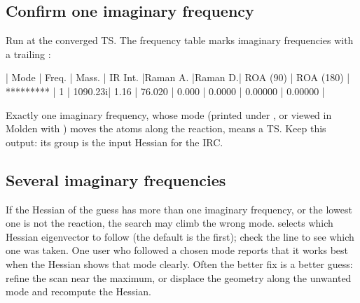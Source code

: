 \documentclass[letterpaper,10pt,english,openany,oneside]{sphinxmanual}
\begin{document}
\subsection{Confirm one imaginary frequency}
\label{\detokenize{tasks/ts-irc-scan:confirm-one-imaginary-frequency}}
\sphinxAtStartPar
Run  at the converged TS. The frequency table marks imaginary frequencies with a trailing :

\begin{sphinxVerbatim}[commandchars=\\\{\}]
 | Mode | Freq.   | Mass.  | IR Int. |Raman A. |Raman D.| ROA (90)  | ROA (180) |
 *\PYGZhy{}\PYGZhy{}\PYGZhy{}\PYGZhy{}\PYGZhy{}\PYGZhy{}*\PYGZhy{}\PYGZhy{}\PYGZhy{}\PYGZhy{}\PYGZhy{}\PYGZhy{}\PYGZhy{}\PYGZhy{}\PYGZhy{}*\PYGZhy{}\PYGZhy{}\PYGZhy{}\PYGZhy{}\PYGZhy{}\PYGZhy{}\PYGZhy{}\PYGZhy{}*\PYGZhy{}\PYGZhy{}\PYGZhy{}\PYGZhy{}\PYGZhy{}\PYGZhy{}\PYGZhy{}\PYGZhy{}\PYGZhy{}*\PYGZhy{}\PYGZhy{}\PYGZhy{}\PYGZhy{}\PYGZhy{}\PYGZhy{}\PYGZhy{}\PYGZhy{}\PYGZhy{}*\PYGZhy{}\PYGZhy{}\PYGZhy{}\PYGZhy{}\PYGZhy{}\PYGZhy{}\PYGZhy{}\PYGZhy{}*\PYGZhy{}\PYGZhy{}\PYGZhy{}\PYGZhy{}\PYGZhy{}\PYGZhy{}\PYGZhy{}\PYGZhy{}\PYGZhy{}\PYGZhy{}\PYGZhy{}*\PYGZhy{}\PYGZhy{}\PYGZhy{}\PYGZhy{}\PYGZhy{}\PYGZhy{}\PYGZhy{}\PYGZhy{}\PYGZhy{}\PYGZhy{}\PYGZhy{}*
 |    1 | 1090.23i|   1.16 |  76.020 |   0.000 | 0.0000 |   0.00000 |   0.00000 |
\end{sphinxVerbatim}



\sphinxAtStartPar
Exactly one imaginary frequency, whose mode (printed under , or viewed in Molden with
) moves the atoms along the reaction, means a TS. Keep this output: its  group is the input
Hessian for the IRC.




\subsection{Several imaginary frequencies}
\label{\detokenize{tasks/ts-irc-scan:several-imaginary-frequencies}}
\sphinxAtStartPar
If the Hessian of the guess has more than one imaginary frequency, or the lowest one is not the reaction, the
search may climb the wrong mode. {\hyperref[\detokenize{reference/optimize:optimize-follow}]{}} selects which Hessian eigenvector to follow (the
default is the first); check the  line to see which one was taken. One user who followed a chosen mode reports
that it works best when the Hessian shows that mode clearly. Often the better fix is a better guess: refine the scan
near the maximum, or displace the geometry along the unwanted mode and recompute the Hessian.
\end{document}
